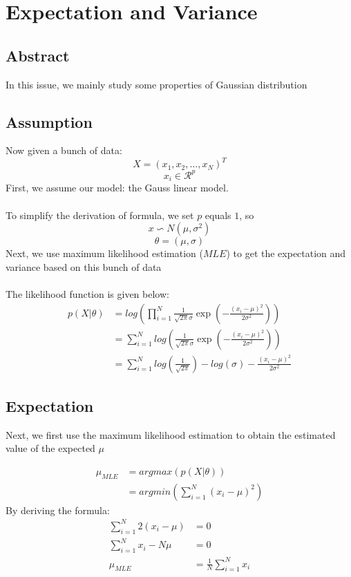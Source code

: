 \documentclass{report}
\begin{document}
\section{Expectation and Variance}
\subsection{Abstract}
In this issue, we mainly study some properties of Gaussian distribution
\subsection{Assumption}
Now given a bunch of data:
$$
X=(x_1, x_2, ..., x_N)^T
$$
$$
x_i \in \mathcal{R}^p
$$
First, we assume our model: the Gauss linear model.\\\\
To simplify the derivation of formula, we set $p$ equals $1$, so
$$
x \backsim N(\mu, \sigma^2)
$$
$$
\theta=(\mu, \sigma)
$$ 
Next, we use maximum likelihood estimation ($MLE $) to get the expectation and variance based on this bunch of data\\\\
The likelihood function is given below:
$$
\begin{aligned}
p(X|\theta)&=log(\prod_{i=1}^N \frac{1}{\sqrt{2\pi}\sigma} \exp(-\frac{(x_i-\mu)^2}{2\sigma^2})) \\
&=\sum_{i=1}^N log(\frac{1}{\sqrt{2\pi}\sigma} \exp(-\frac{(x_i-\mu)^2}{2\sigma^2}))\\
&=\sum_{i=1}^N log(\frac{1}{\sqrt{2\pi}}) - log(\sigma) - \frac{(x_i-\mu)^2}{2\sigma^2}
\end{aligned}
$$
\subsection{Expectation}
Next, we first use the maximum likelihood estimation to obtain the estimated value of the expected $\mu $

$$
\begin{aligned}
\mu_{MLE}
&=argmax(p(X|\theta))\\
&=argmin(\sum_{i=1}^N (x_i-\mu)^2)
\end{aligned}
$$
By deriving the formula:
$$
\begin{aligned}
\sum_{i=1}^N 2(x_i-\mu)&=0\\
\sum_{i=1}^N x_i - N \mu&=0\\
\mu_{MLE}&=\frac{1}{N} \sum_{i=1}^N x_i\\
\end{aligned}
$$
\end{document}
